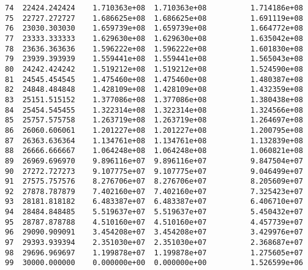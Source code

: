 \documentclass[11pt]{article}
\begin{document}
\begin{verbatim}
74  22424.242424    1.710363e+08  1.710363e+08          1.714186e+08   
75  22727.272727    1.686625e+08  1.686625e+08          1.691119e+08   
76  23030.303030    1.659739e+08  1.659739e+08          1.664772e+08   
77  23333.333333    1.629630e+08  1.629630e+08          1.635042e+08   
78  23636.363636    1.596222e+08  1.596222e+08          1.601830e+08   
79  23939.393939    1.559441e+08  1.559441e+08          1.565043e+08   
80  24242.424242    1.519212e+08  1.519212e+08          1.524590e+08   
81  24545.454545    1.475460e+08  1.475460e+08          1.480387e+08   
82  24848.484848    1.428109e+08  1.428109e+08          1.432359e+08   
83  25151.515152    1.377086e+08  1.377086e+08          1.380438e+08   
84  25454.545455    1.322314e+08  1.322314e+08          1.324566e+08   
85  25757.575758    1.263719e+08  1.263719e+08          1.264697e+08   
86  26060.606061    1.201227e+08  1.201227e+08          1.200795e+08   
87  26363.636364    1.134761e+08  1.134761e+08          1.132839e+08   
88  26666.666667    1.064248e+08  1.064248e+08          1.060821e+08   
89  26969.696970    9.896116e+07  9.896116e+07          9.847504e+07   
90  27272.727273    9.107775e+07  9.107775e+07          9.046499e+07   
91  27575.757576    8.276706e+07  8.276706e+07          8.205609e+07   
92  27878.787879    7.402160e+07  7.402160e+07          7.325423e+07   
93  28181.818182    6.483387e+07  6.483387e+07          6.406710e+07   
94  28484.848485    5.519637e+07  5.519637e+07          5.450432e+07   
95  28787.878788    4.510160e+07  4.510160e+07          4.457739e+07   
96  29090.909091    3.454208e+07  3.454208e+07          3.429976e+07   
97  29393.939394    2.351030e+07  2.351030e+07          2.368687e+07   
98  29696.969697    1.199878e+07  1.199878e+07          1.275605e+07   
99  30000.000000    0.000000e+00  0.000000e+00          1.526599e+06   


\end{verbatim}
\end{document}
